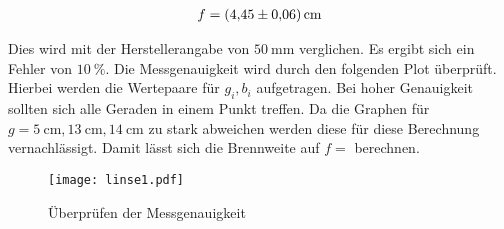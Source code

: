 \begin{align*}
  f = \SI{4.45\pm0.06}{\centi\metre}
\end{align*}

Dies wird mit der Herstellerangabe von $\SI{50}{\milli\metre}$ verglichen.
Es ergibt sich ein Fehler von $\SI{10}{\percent}$.
Die Messgenauigkeit wird durch den folgenden Plot überprüft.
Hierbei werden die Wertepaare für $g_i, b_i$ aufgetragen.
Bei hoher Genauigkeit sollten sich alle Geraden in einem Punkt treffen.
Da die Graphen für $g = \SI{5}{\centi\metre}, \SI{13}{\centi\metre}, \SI{14}{\centi\metre}$ zu stark abweichen werden diese für diese Berechnung vernachlässigt.
Damit lässt sich die Brennweite auf $f= $ berechnen.

\begin{figure}
  \centering
  \texttt{[image: linse1.pdf]}
  \caption{Überprüfen der Messgenauigkeit}
  \label{fig:Messgenauigkeit}
\end{figure}
